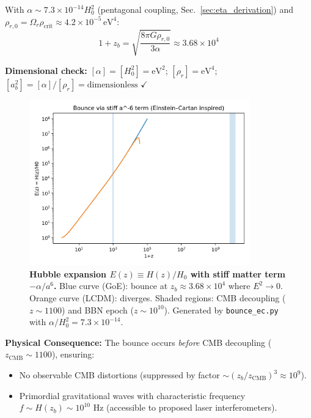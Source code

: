 \documentclass[12pt]{article}
\begin{document}
With $\alpha \sim 7.3 \times 10^{-14} H_0^2$ (pentagonal coupling, Sec.~\ref{sec:eta_derivation}) and $\rho_{r,0} = \Omega_r \rho_{\text{crit}} \approx 4.2 \times 10^{-5} \, \text{eV}^4$:
\begin{equation}
1 + z_b = \sqrt{\frac{8\pi G \rho_{r,0}}{3\alpha}} \approx 3.68 \times 10^4
\end{equation}

\textbf{Dimensional check:} $[\alpha] = [H_0^2] = \text{eV}^2$; $[\rho_r] = \text{eV}^4$; $[a_b^2] = [\alpha]/[\rho_r] = \text{dimensionless}$ $\checkmark$

\begin{figure}[h]
\centering
\includegraphics[width=0.85\textwidth]{figures/Ez_bounce.png}
\caption{\textbf{Hubble expansion $E(z) \equiv H(z)/H_0$ with stiff matter term $-\alpha/a^6$.} Blue curve (GoE): bounce at $z_b \approx 3.68 \times 10^4$ where $E^2 \to 0$. Orange curve (LCDM): diverges. Shaded regions: CMB decoupling ($z \sim 1100$) and BBN epoch ($z \sim 10^{10}$). Generated by \texttt{bounce\_ec.py} with $\alpha/H_0^2 = 7.3 \times 10^{-14}$.}
\label{fig:Ez_bounce}
\end{figure}

\textbf{Physical Consequence:} The bounce occurs \textit{before} CMB decoupling ($z_{\text{CMB}} \sim 1100$), ensuring:
\begin{itemize}
\item No observable CMB distortions (suppressed by factor $\sim (z_b/z_{\text{CMB}})^3 \approx 10^9$).
\item Primordial gravitational waves with characteristic frequency $f \sim H(z_b) \sim 10^{10}$ Hz (accessible to proposed laser interferometers).
\end{itemize}
\end{document}
